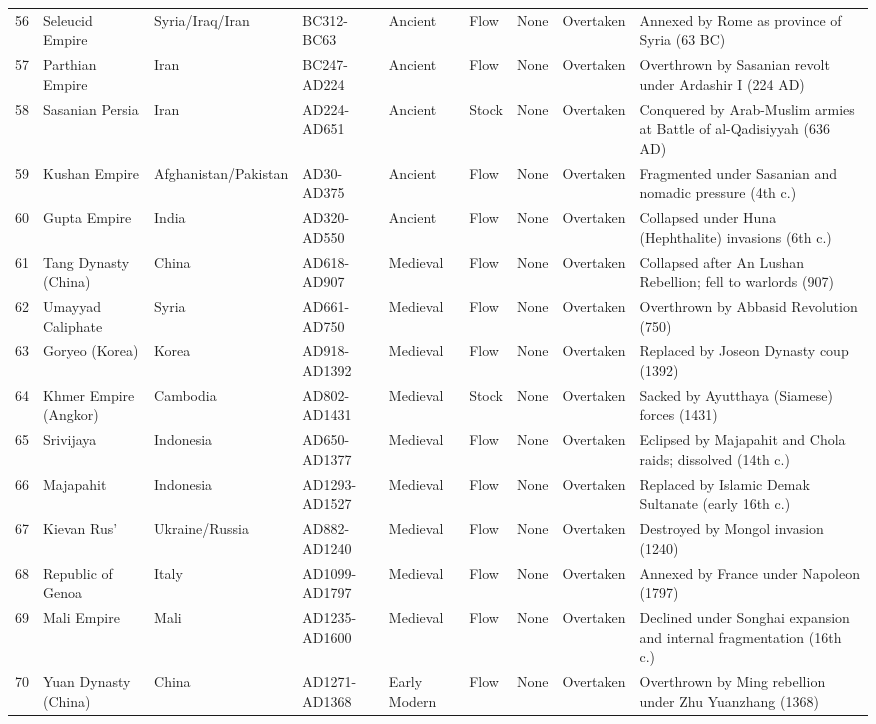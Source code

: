 \documentclass[11pt]{article}
\begin{document}
\begin{longtable}{rlllllllp{6cm}}
56 & Seleucid Empire & Syria/Iraq/Iran & BC312-BC63 & Ancient & Flow & None & Overtaken & Annexed by Rome as province of Syria (63 BC) \\
57 & Parthian Empire & Iran & BC247-AD224 & Ancient & Flow & None & Overtaken & Overthrown by Sasanian revolt under Ardashir I (224 AD) \\
58 & Sasanian Persia & Iran & AD224-AD651 & Ancient & Stock & None & Overtaken & Conquered by Arab-Muslim armies at Battle of al-Qadisiyyah (636 AD) \\
59 & Kushan Empire & Afghanistan/Pakistan & AD30-AD375 & Ancient & Flow & None & Overtaken & Fragmented under Sasanian and nomadic pressure (4th c.) \\
60 & Gupta Empire & India & AD320-AD550 & Ancient & Flow & None & Overtaken & Collapsed under Huna (Hephthalite) invasions (6th c.) \\
61 & Tang Dynasty (China) & China & AD618-AD907 & Medieval & Flow & None & Overtaken & Collapsed after An Lushan Rebellion; fell to warlords (907) \\
62 & Umayyad Caliphate & Syria & AD661-AD750 & Medieval & Flow & None & Overtaken & Overthrown by Abbasid Revolution (750) \\
63 & Goryeo (Korea) & Korea & AD918-AD1392 & Medieval & Flow & None & Overtaken & Replaced by Joseon Dynasty coup (1392) \\
64 & Khmer Empire (Angkor) & Cambodia & AD802-AD1431 & Medieval & Stock & None & Overtaken & Sacked by Ayutthaya (Siamese) forces (1431) \\
65 & Srivijaya & Indonesia & AD650-AD1377 & Medieval & Flow & None & Overtaken & Eclipsed by Majapahit and Chola raids; dissolved (14th c.) \\
66 & Majapahit & Indonesia & AD1293-AD1527 & Medieval & Flow & None & Overtaken & Replaced by Islamic Demak Sultanate (early 16th c.) \\
67 & Kievan Rus' & Ukraine/Russia & AD882-AD1240 & Medieval & Flow & None & Overtaken & Destroyed by Mongol invasion (1240) \\
68 & Republic of Genoa & Italy & AD1099-AD1797 & Medieval & Flow & None & Overtaken & Annexed by France under Napoleon (1797) \\
69 & Mali Empire & Mali & AD1235-AD1600 & Medieval & Flow & None & Overtaken & Declined under Songhai expansion and internal fragmentation (16th c.) \\
70 & Yuan Dynasty (China) & China & AD1271-AD1368 & Early Modern & Flow & None & Overtaken & Overthrown by Ming rebellion under Zhu Yuanzhang (1368) \\

\end{longtable}
\end{document}

